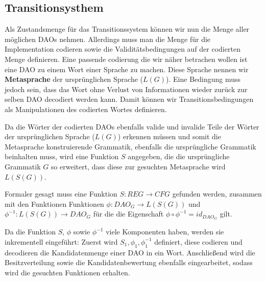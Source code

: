\documentclass[]{article}
\begin{document}
% 

% 




\subsection*{Transitionsysthem}
Als Zustandsmenge für das Transitionssystem können wir nun die Menge aller möglichen DAOs nehmen. Allerdings muss man die Menge für die Implementation codieren sowie die Validitätsbedingungen auf der codierten Menge definieren. Eine passende codierung die wir näher betrachen wollen ist eine DAO zu einem Wort einer Sprache zu machen. Diese Sprache nennen wir \textbf{Metasprache} der ursprünglichen Sprache ($L(G)$). Eine Bedingung muss jedoch sein, dass das Wort ohne Verlust von Informationen wieder zurück zur selben DAO decodiert werden kann. Damit können wir Transitionsbedingungen als Manipulationen des codierten Wortes definieren. 

Da die Wörter der codierten DAOs ebenfalls valide und invalide Teile der Wörter der ursprünglichen Sprache ($L(G)$) erkennen müssen und somit die Metasprache konstruierende Grammatik, ebenfalls die ursprüngliche Grammatik beinhalten muss, wird eine Funktion $S$ angegeben, die die ursprüngliche Grammatik $G$ so erweitert, dass diese zur gesuchten Metasprache wird $L(S(G))$.

Formaler gesagt muss eine Funktion $S: REG\rightarrow CFG$ gefunden werden, zusammen mit den Funktionen Funktionen $\phi: DAO_G \rightarrow L(S(G))$ und $\phi^{-1}: L(S(G)) \rightarrow DAO_G$ für die die Eigenschaft $\phi\circ\phi^{-1} = id_{DAO_G}$ gilt.

Da die Funktion $S$, $\phi$ sowie $\phi^{-1}$ viele Komponenten haben, werden sie inkrementell eingeführt: Zuerst wird $S_1, \phi_1, \phi^{-1}_1$ definiert, diese codieren und decodieren die Kandidatenmenge einer DAO in ein Wort. Anschließend wird die Besitzverteilung sowie die Kandidatenbewertung ebenfalls eingearbeitet, sodass wird die gesuchten Funktionen erhalten.
\end{document}
